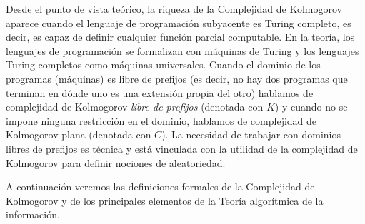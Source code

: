 Desde el punto de 
vista teórico, la riqueza de la Complejidad de Kolmogorov
aparece cuando el lenguaje de programación subyacente es 
Turing completo, 
es decir, es capaz de definir cualquier función parcial
computable. En la teoría, los lenguajes de programación se
formalizan con máquinas de Turing y los lenguajes Turing completos
como máquinas universales. 
Cuando el dominio de los programas (máquinas) es libre de prefijos (es decir, no hay dos programas
que terminan en dónde uno es una extensión propia del otro)
hablamos de complejidad de Kolmogorov {\em libre de prefijos}
(denotada con $K$) y cuando no se impone ninguna restricción en
el dominio, hablamos de complejidad de Kolmogorov plana (denotada
con $C$). La necesidad de trabajar con dominios libres de prefijos es
técnica y está vinculada con la utilidad de la complejidad de Kolmogorov 
para definir nociones de aleatoriedad.

A continuación veremos las definiciones formales de la Complejidad de Kolmogorov y de los
principales elementos de la Teoría algorítmica de la información.




